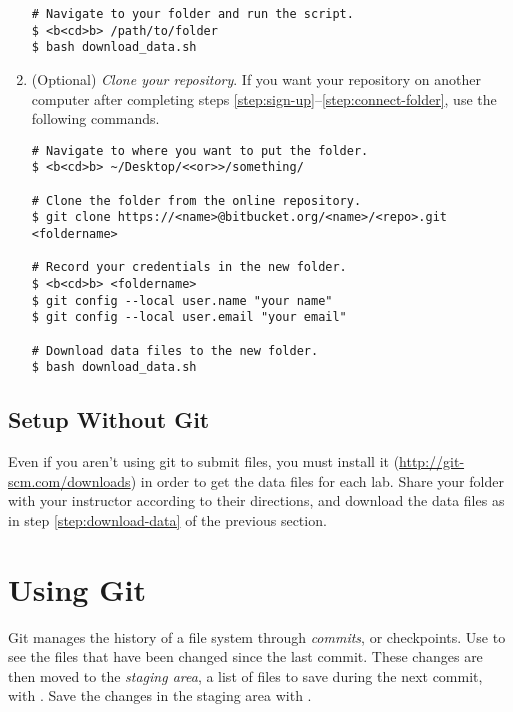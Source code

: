 \begin{enumerate}
\begin{lstlisting}
# Navigate to your folder and run the script.
$ <b<cd>b> /path/to/folder
$ bash download_data.sh
\end{lstlisting}

\item (Optional) \emph{Clone your repository}.
If you want your repository on another computer after completing steps \ref{step:sign-up}--\ref{step:connect-folder}, use the following commands.

\begin{lstlisting}
# Navigate to where you want to put the folder.
$ <b<cd>b> ~/Desktop/<<or>>/something/

# Clone the folder from the online repository.
$ git clone https://<name>@bitbucket.org/<name>/<repo>.git <foldername>

# Record your credentials in the new folder.
$ <b<cd>b> <foldername>
$ git config --local user.name "your name"
$ git config --local user.email "your email"

# Download data files to the new folder.
$ bash download_data.sh
\end{lstlisting}
\end{enumerate}

\subsection*{Setup Without Git} %

Even if you aren't using git to submit files, you must install it (\url{http://git-scm.com/downloads}) in order to get the data files for each lab.
Share your folder with your instructor according to their directions, and download the data files as in step \ref{step:download-data} of the previous section.

\section*{Using Git} %

Git manages the history of a file system through \emph{commits}, or checkpoints.
Use  to see the files that have been changed since the last commit.
These changes are then moved to the \emph{staging area}, a list of files to save during the next commit, with .
Save the changes in the staging area with .

